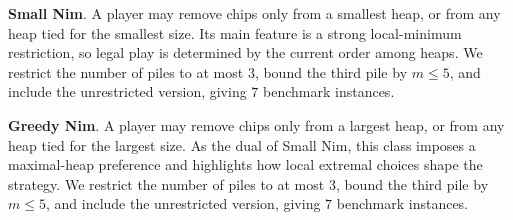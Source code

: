 \documentclass[review]{elsarticle}
\newcommand{\set}[1]{\{ #1 \}}
\newcommand{\tuple}[1]{\langle {#1} \rangle}
\newcommand{\true}{\top}
\newcommand{\statevar}{\mathcal{X}}
\newcommand{\act}{\mathcal{A}}
\newcommand{\constraint}{\mathcal{C}}
\newcommand{\estate}{\mathcal{E}}
\newcommand{\pre}{\mathtt{pre}}
\newcommand{\eff}{\mathtt{eff}}
\begin{document}
{\color{red}\textbf{Small Nim}. A player may remove chips only from a smallest heap, or from any heap tied for the smallest size.}
{\color{red}Its main feature is a strong local-minimum restriction, so legal play is determined by the current order among heaps.}
{\color{red}We restrict the number of piles to at most $3$, bound the third pile by $m \le 5$, and include the unrestricted version, giving $7$ benchmark instances.}

{\color{red}\textbf{Greedy Nim}. A player may remove chips only from a largest heap, or from any heap tied for the largest size.}
{\color{red}As the dual of Small Nim, this class imposes a maximal-heap preference and highlights how local extremal choices shape the strategy.}
{\color{red}We restrict the number of piles to at most $3$, bound the third pile by $m \le 5$, and include the unrestricted version, giving $7$ benchmark instances.}
\end{document}
